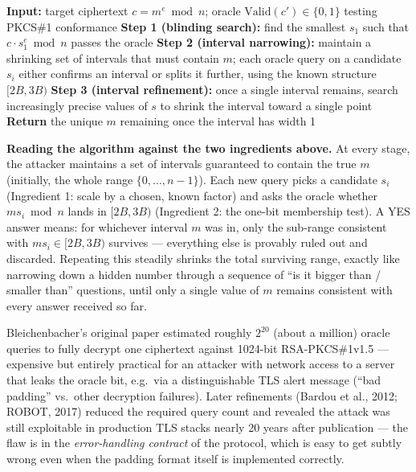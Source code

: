 \begin{algorithm}[h]
\caption{Bleichenbacher's Attack (structure, not full case analysis)}
\begin{algorithmic}[1]
\State \textbf{Input:} target ciphertext $c = m^e \bmod n$; oracle $\mathrm{Valid}(c') \in \{0,1\}$ testing PKCS\#1 conformance
\State \textbf{Step 1 (blinding search):} find the smallest $s_1$ such that $c \cdot s_1^{e} \bmod n$ passes the oracle
\State \textbf{Step 2 (interval narrowing):} maintain a shrinking set of intervals that must contain $m$; each oracle query on a candidate $s_i$ either confirms an interval or splits it further, using the known structure $[2B,3B)$
\State \textbf{Step 3 (interval refinement):} once a single interval remains, search increasingly precise values of $s$ to shrink the interval toward a single point
\State \textbf{Return} the unique $m$ remaining once the interval has width 1
\end{algorithmic}
\end{algorithm}

\medskip\noindent\textbf{Reading the algorithm against the two ingredients above.} At every stage, the attacker maintains a set of intervals guaranteed to contain the true $m$ (initially, the whole range $\{0,\dots,n-1\}$). Each new query picks a candidate $s_i$ (Ingredient 1: scale by a chosen, known factor) and asks the oracle whether $m s_i \bmod n$ lands in $[2B,3B)$ (Ingredient 2: the one-bit membership test). A YES answer means: for whichever interval $m$ was in, only the sub-range consistent with $ms_i\in[2B,3B)$ survives — everything else is provably ruled out and discarded. Repeating this steadily shrinks the total surviving range, exactly like narrowing down a hidden number through a sequence of ``is it bigger than / smaller than'' questions, until only a single value of $m$ remains consistent with every answer received so far.

\begin{remark}
Bleichenbacher's original paper estimated roughly $2^{20}$ (about a million) oracle queries to fully decrypt one ciphertext against 1024-bit RSA-PKCS\#1v1.5 — expensive but entirely practical for an attacker with network access to a server that leaks the oracle bit, e.g.\ via a distinguishable TLS alert message (``bad padding'' vs.\ other decryption failures). Later refinements (Bardou et al., 2012; ROBOT, 2017) reduced the required query count and revealed the attack was still exploitable in production TLS stacks nearly 20 years after publication — the flaw is in the \emph{error-handling contract} of the protocol, which is easy to get subtly wrong even when the padding format itself is implemented correctly.
\end{remark}

